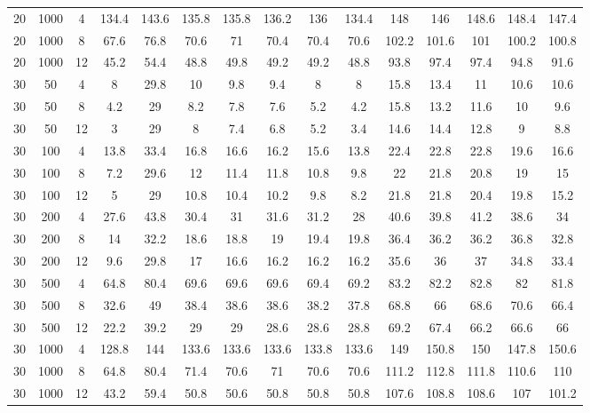 \documentclass[review,3p,times,authoryear,12pt]{elsarticle}
\begin{document}
\begin{table}[htbp]
\begin{tabular}{ccccccccccccccc}
    20    & 1000  & 4     & 134.4 & 143.6 & 135.8 & 135.8 & 136.2 & 136   & 134.4 & 148   & 146   & 148.6 & 148.4 & 147.4 \\
    20    & 1000  & 8     & 67.6  & 76.8  & 70.6  & 71    & 70.4  & 70.4  & 70.6  & 102.2 & 101.6 & 101   & 100.2 & 100.8 \\
    20    & 1000  & 12    & 45.2  & 54.4  & 48.8  & 49.8  & 49.2  & 49.2  & 48.8  & 93.8  & 97.4  & 97.4  & 94.8  & 91.6 \\
    30    & 50    & 4     & 8     & 29.8  & 10    & 9.8   & 9.4   & 8     & 8     & 15.8  & 13.4  & 11    & 10.6  & 10.6 \\
    30    & 50    & 8     & 4.2   & 29    & 8.2   & 7.8   & 7.6   & 5.2   & 4.2   & 15.8  & 13.2  & 11.6  & 10    & 9.6 \\
    30    & 50    & 12    & 3     & 29    & 8     & 7.4   & 6.8   & 5.2   & 3.4   & 14.6  & 14.4  & 12.8  & 9     & 8.8 \\
    30    & 100   & 4     & 13.8  & 33.4  & 16.8  & 16.6  & 16.2  & 15.6  & 13.8  & 22.4  & 22.8  & 22.8  & 19.6  & 16.6 \\
    30    & 100   & 8     & 7.2   & 29.6  & 12    & 11.4  & 11.8  & 10.8  & 9.8   & 22    & 21.8  & 20.8  & 19    & 15 \\
    30    & 100   & 12    & 5     & 29    & 10.8  & 10.4  & 10.2  & 9.8   & 8.2   & 21.8  & 21.8  & 20.4  & 19.8  & 15.2 \\
    30    & 200   & 4     & 27.6  & 43.8  & 30.4  & 31    & 31.6  & 31.2  & 28    & 40.6  & 39.8  & 41.2  & 38.6  & 34 \\
    30    & 200   & 8     & 14    & 32.2  & 18.6  & 18.8  & 19    & 19.4  & 19.8  & 36.4  & 36.2  & 36.2  & 36.8  & 32.8 \\
    30    & 200   & 12    & 9.6   & 29.8  & 17    & 16.6  & 16.2  & 16.2  & 16.2  & 35.6  & 36    & 37    & 34.8  & 33.4 \\
    30    & 500   & 4     & 64.8  & 80.4  & 69.6  & 69.6  & 69.6  & 69.4  & 69.2  & 83.2  & 82.2  & 82.8  & 82    & 81.8 \\
    30    & 500   & 8     & 32.6  & 49    & 38.4  & 38.6  & 38.6  & 38.2  & 37.8  & 68.8  & 66    & 68.6  & 70.6  & 66.4 \\
    30    & 500   & 12    & 22.2  & 39.2  & 29    & 29    & 28.6  & 28.6  & 28.8  & 69.2  & 67.4  & 66.2  & 66.6  & 66 \\
    30    & 1000  & 4     & 128.8 & 144   & 133.6 & 133.6 & 133.6 & 133.8 & 133.6 & 149   & 150.8 & 150   & 147.8 & 150.6 \\
    30    & 1000  & 8     & 64.8  & 80.4  & 71.4  & 70.6  & 71    & 70.6  & 70.6  & 111.2 & 112.8 & 111.8 & 110.6 & 110 \\
    30    & 1000  & 12    & 43.2  & 59.4  & 50.8  & 50.6  & 50.8  & 50.8  & 50.8  & 107.6 & 108.8 & 108.6 & 107   & 101.2 \\

    \hline
    \end{tabular}
  \label{tab:3}
\end{table}
\end{document}
